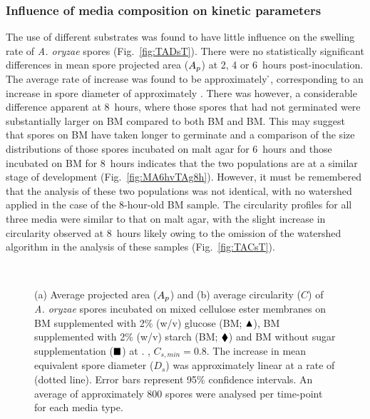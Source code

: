 \subsubsection{Influence of media composition on kinetic parameters}

The use of different substrates was found to have little influence on the swelling rate of \emph{A. oryzae} spores (Fig.~\ref{fig:TADsT}). There were no statistically significant differences in mean spore projected area ($A_p$) at 2, 4 or 6~hours post-inoculation. The average rate of increase was found to be approximately \h{}, corresponding to an increase in spore diameter of approximately . There was however, a considerable difference apparent at 8~hours, where those spores that had not germinated were substantially larger on BM compared to both BM and BM. This may suggest that spores on BM have taken longer to germinate and a comparison of the size distributions of those spores incubated on malt agar for 6~hours and those incubated on BM for 8~hours indicates that the two populations are at a similar stage of development (Fig.~\ref{fig:MA6hvTAg8h}). However, it must be remembered that the analysis of these two populations was not identical, with no watershed applied in the case of the 8-hour-old BM sample. The circularity profiles for all three media were similar to that on malt agar, with the slight increase in circularity observed at 8~hours likely owing to the omission of the watershed algorithm in the analysis of these samples (Fig.~\ref{fig:TACsT}).

\begin{figure}[htbp]
	\centering
	\captionsetup[subfloat]{position=top}
	\\
	\caption{(a) Average projected area ($A_p$) and (b) average circularity ($C$) of \emph{A. oryzae} spores incubated on mixed cellulose ester membranes on BM supplemented with 2\% (w/v) glucose (BM; $\blacktriangle$), BM supplemented with 2\% (w/v) starch (BM; $\blacklozenge$) and BM without sugar supplementation ($\blacksquare$) at . , $C_{s, min} = 0.8$. The increase in mean equivalent spore diameter ($D_s$) was approximately linear at a rate of  (dotted line). Error bars represent 95\% confidence intervals. An average of approximately 800 spores were analysed per time-point for each media type.}
\end{figure}

